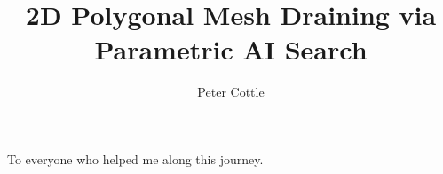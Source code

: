 \documentclass[masters]{ucbthesis}
\begin{document}

\title{2D Polygonal Mesh Draining via Parametric AI Search}
\author{Peter Cottle}


\maketitle
\approvalpage
\copyrightpage



\begin{frontmatter}



\tableofcontents
\clearpage
\listoffigures
\clearpage
\listoftables

\begin{acknowledgements}
To everyone who helped me along this journey.
\end{acknowledgements}

\end{frontmatter}

\pagestyle{headings}








\printbibliography
\end{document}
